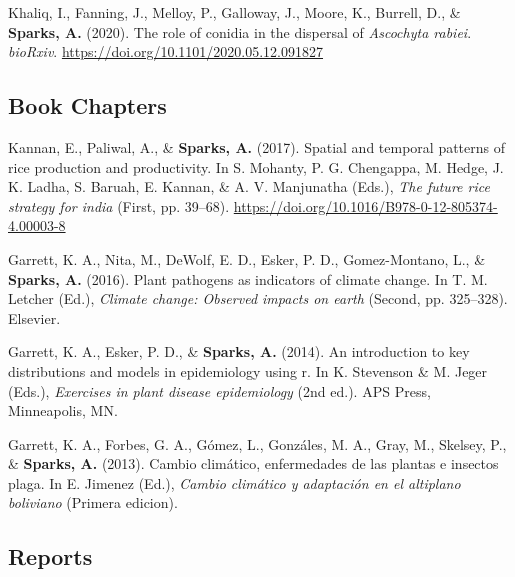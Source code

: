 \documentclass[11pt, a4paper]{awesome-cv}
\begin{document}
\begingroup
\setlength{\parindent}{-0.5in}
\setlength{\leftskip}{0.5in}

\hypertarget{refs_preprints}{}
\leavevmode{}%
Khaliq, I., Fanning, J., Melloy, P., Galloway, J., Moore, K., Burrell,
D., \& \textbf{Sparks, A.} (2020). The role of conidia in the dispersal
of \emph{{Ascochyta} rabiei}. \emph{bioRxiv}.
\url{https://doi.org/10.1101/2020.05.12.091827}

\endgroup

\hypertarget{book-chapters}{%
\subsection{Book Chapters}\label{book-chapters}}

\begingroup
\setlength{\parindent}{-0.5in}
\setlength{\leftskip}{0.5in}

\hypertarget{refs_books}{}
\leavevmode{}%
Kannan, E., Paliwal, A., \& \textbf{Sparks, A.} (2017). Spatial and
temporal patterns of rice production and productivity. In S. Mohanty, P.
G. Chengappa, M. Hedge, J. K. Ladha, S. Baruah, E. Kannan, \& A. V.
Manjunatha (Eds.), \emph{The future rice strategy for india} (First, pp.
39--68). \url{https://doi.org/10.1016/B978-0-12-805374-4.00003-8}

\leavevmode{}%
Garrett, K. A., Nita, M., DeWolf, E. D., Esker, P. D., Gomez-Montano,
L., \& \textbf{Sparks, A.} (2016). Plant pathogens as indicators of
climate change. In T. M. Letcher (Ed.), \emph{Climate change: Observed
impacts on earth} (Second, pp. 325--328). Elsevier.

\leavevmode{}%
Garrett, K. A., Esker, P. D., \& \textbf{Sparks, A.} (2014). An
introduction to key distributions and models in epidemiology using r. In
K. Stevenson \& M. Jeger (Eds.), \emph{Exercises in plant disease
epidemiology} (2nd ed.). APS Press, Minneapolis, MN.

\leavevmode{}%
Garrett, K. A., Forbes, G. A., Gómez, L., Gonzáles, M. A., Gray, M.,
Skelsey, P., \& \textbf{Sparks, A.} (2013). Cambio climático,
enfermedades de las plantas e insectos plaga. In E. Jimenez (Ed.),
\emph{Cambio climático y adaptación en el altiplano boliviano} (Primera
edicion).

\endgroup

\hypertarget{reports}{%
\subsection{Reports}\label{reports}}
\end{document}
